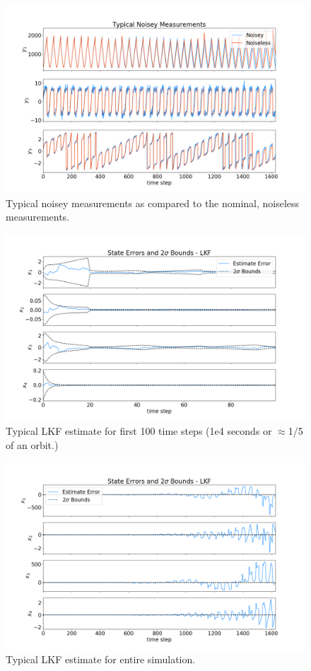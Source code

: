 \documentclass[11pt, a4paper]{article}
\begin{document}
\begin{figure}[H]
	\centering
	\includegraphics[width=\textwidth]{Figures/noisey_meas.png}
	\caption{Typical noisey measurements as compared to the nominal, noiseless measurements.}
	\label{fig:noisey_meas}
\end{figure}

\begin{figure}[H]
	\centering
	\includegraphics[width=\textwidth]{Figures/lkf_estimate_th_ZOOM.png}
	\caption{Typical LKF estimate for first 100 time steps (1e4 seconds or $\approx$1/5 of an orbit.)}
	\label{fig:lkf_est_zoom}
\end{figure}

\begin{figure}[H]
	\centering
	\includegraphics[width=\textwidth]{Figures/lkf_estimate_th.png}
	\caption{Typical LKF estimate for entire simulation.}
	\label{fig:lkf_est}
\end{figure}
\end{document}
